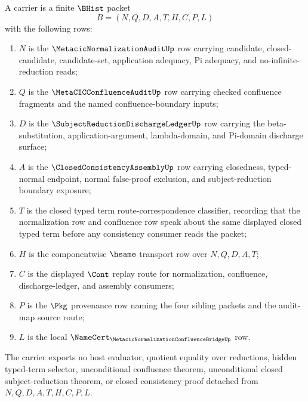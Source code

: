 \begin{definition}
\label{def:metacic-normalization-confluence-bridge-carrier}
A \MetacicNormalizationConfluenceBridgeUp{} carrier is a finite $\BHist$ packet
$$
B=(N,Q,D,A,T,H,C,P,L)
$$
with the following rows:
\begin{enumerate}
\item $N$ is the $\MetacicNormalizationAuditUp$ row carrying candidate, closed-candidate, candidate-set, application adequacy, Pi adequacy, and no-infinite-reduction reads;
\item $Q$ is the $\MetaCICConfluenceAuditUp$ row carrying checked confluence fragments and the named confluence-boundary inputs;
\item $D$ is the $\SubjectReductionDischargeLedgerUp$ row carrying the beta-substitution, application-argument, lambda-domain, and Pi-domain discharge surface;
\item $A$ is the $\ClosedConsistencyAssemblyUp$ row carrying closedness, typed-normal endpoint, normal false-proof exclusion, and subject-reduction boundary exposure;
\item $T$ is the closed typed term route-correspondence classifier, recording that the normalization row and confluence row speak about the same displayed closed typed term before any consistency consumer reads the packet;
\item $H$ is the componentwise $\hsame$ transport row over $N,Q,D,A,T$;
\item $C$ is the displayed $\Cont$ replay route for normalization, confluence, discharge-ledger, and assembly consumers;
\item $P$ is the $\Pkg$ provenance row naming the four sibling packets and the audit-map source route;
\item $L$ is the local $\NameCert_{\MetacicNormalizationConfluenceBridgeUp}$ row.
\end{enumerate}
The carrier exports no host evaluator, quotient equality over reductions, hidden typed-term selector, unconditional confluence theorem, unconditional closed subject-reduction theorem, or closed consistency proof detached from $N,Q,D,A,T,H,C,P,L$.
\end{definition}


